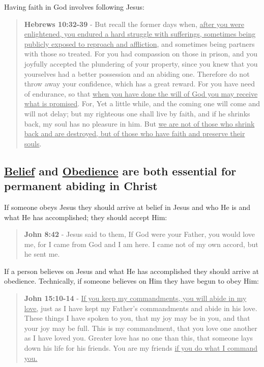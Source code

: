 \documentclass[11pt]{article}
\begin{document}
Having faith in God involves following Jesus:

\begin{quote}
\textbf{Hebrews 10:32-39} - But recall the former days when, \uline{after you were enlightened, you endured a hard struggle with sufferings, sometimes being publicly exposed to reproach and affliction}, and sometimes being partners with those so treated. For you had compassion on those in prison, and you joyfully accepted the plundering of your property, since you knew that you yourselves had a better possession and an abiding one. Therefore do not throw away your confidence, which has a great reward. For you have need of endurance, so that \uline{when you have done the will of God you may receive what is promised}. For, Yet a little while, and the coming one will come and will not delay; but my righteous one shall live by faith, and if he shrinks back, my soul has no pleasure in him. But \uline{we are not of those who shrink back and are destroyed, but of those who have faith and preserve their souls}.
\end{quote}

\subsection{\underline{Belief} and \underline{Obedience} are both essential for permanent abiding in Christ}
\label{sec:org1c0026f}
If someone obeys Jesus they should arrive at belief in Jesus and who He is and what He has accomplished; they should accept Him:

\begin{quote}
\textbf{John 8:42} - Jesus said to them, If God were your Father, you would love me, for I came from God and I am here. I came not of my own accord, but he sent me.
\end{quote}

If a person believes on Jesus and what He has accomplished they should arrive at obedience. Technically, if someone believes on Him they have begun to obey Him:

\begin{quote}
\textbf{John 15:10-14} - \uline{If you keep my commandments, you will abide in my love,} just as I have kept my Father's commandments and abide in his love. These things I have spoken to you, that my joy may be in you, and that your joy may be full. This is my commandment, that you love one another as I have loved you. Greater love has no one than this, that someone lays down his life for his friends. You are my friends \uline{if you do what I command you.}
\end{quote}
\end{document}
